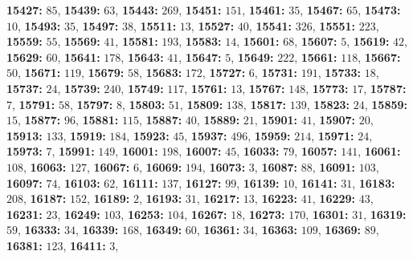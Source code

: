 \textsf{\bfseries 15427:} $85$, \textsf{\bfseries 15439:} $63$, \textsf{\bfseries 15443:} $269$, \textsf{\bfseries 15451:} $151$, \textsf{\bfseries 15461:} $35$, \textsf{\bfseries 15467:} $65$, \textsf{\bfseries 15473:} $10$, \textsf{\bfseries 15493:} $35$, \textsf{\bfseries 15497:} $38$, \textsf{\bfseries 15511:} $13$, \textsf{\bfseries 15527:} $40$, \textsf{\bfseries 15541:} $326$, \textsf{\bfseries 15551:} $223$, \textsf{\bfseries 15559:} $55$, \textsf{\bfseries 15569:} $41$, \textsf{\bfseries 15581:} $193$, \textsf{\bfseries 15583:} $14$, \textsf{\bfseries 15601:} $68$, \textsf{\bfseries 15607:} $5$, \textsf{\bfseries 15619:} $42$, \textsf{\bfseries 15629:} $60$, \textsf{\bfseries 15641:} $178$, \textsf{\bfseries 15643:} $41$, \textsf{\bfseries 15647:} $5$, \textsf{\bfseries 15649:} $222$, \textsf{\bfseries 15661:} $118$, \textsf{\bfseries 15667:} $50$, \textsf{\bfseries 15671:} $119$, \textsf{\bfseries 15679:} $58$, \textsf{\bfseries 15683:} $172$, \textsf{\bfseries 15727:} $6$, \textsf{\bfseries 15731:} $191$, \textsf{\bfseries 15733:} $18$, \textsf{\bfseries 15737:} $24$, \textsf{\bfseries 15739:} $240$, \textsf{\bfseries 15749:} $117$, \textsf{\bfseries 15761:} $13$, \textsf{\bfseries 15767:} $148$, \textsf{\bfseries 15773:} $17$, \textsf{\bfseries 15787:} $7$, \textsf{\bfseries 15791:} $58$, \textsf{\bfseries 15797:} $8$, \textsf{\bfseries 15803:} $51$, \textsf{\bfseries 15809:} $138$, \textsf{\bfseries 15817:} $139$, \textsf{\bfseries 15823:} $24$, \textsf{\bfseries 15859:} $15$, \textsf{\bfseries 15877:} $96$, \textsf{\bfseries 15881:} $115$, \textsf{\bfseries 15887:} $40$, \textsf{\bfseries 15889:} $21$, \textsf{\bfseries 15901:} $41$, \textsf{\bfseries 15907:} $20$, \textsf{\bfseries 15913:} $133$, \textsf{\bfseries 15919:} $184$, \textsf{\bfseries 15923:} $45$, \textsf{\bfseries 15937:} $496$, \textsf{\bfseries 15959:} $214$, \textsf{\bfseries 15971:} $24$, \textsf{\bfseries 15973:} $7$, \textsf{\bfseries 15991:} $149$, \textsf{\bfseries 16001:} $198$, \textsf{\bfseries 16007:} $45$, \textsf{\bfseries 16033:} $79$, \textsf{\bfseries 16057:} $141$, \textsf{\bfseries 16061:} $108$, \textsf{\bfseries 16063:} $127$, \textsf{\bfseries 16067:} $6$, \textsf{\bfseries 16069:} $194$, \textsf{\bfseries 16073:} $3$, \textsf{\bfseries 16087:} $88$, \textsf{\bfseries 16091:} $103$, \textsf{\bfseries 16097:} $74$, \textsf{\bfseries 16103:} $62$, \textsf{\bfseries 16111:} $137$, \textsf{\bfseries 16127:} $99$, \textsf{\bfseries 16139:} $10$, \textsf{\bfseries 16141:} $31$, \textsf{\bfseries 16183:} $208$, \textsf{\bfseries 16187:} $152$, \textsf{\bfseries 16189:} $2$, \textsf{\bfseries 16193:} $31$, \textsf{\bfseries 16217:} $13$, \textsf{\bfseries 16223:} $41$, \textsf{\bfseries 16229:} $43$, \textsf{\bfseries 16231:} $23$, \textsf{\bfseries 16249:} $103$, \textsf{\bfseries 16253:} $104$, \textsf{\bfseries 16267:} $18$, \textsf{\bfseries 16273:} $170$, \textsf{\bfseries 16301:} $31$, \textsf{\bfseries 16319:} $59$, \textsf{\bfseries 16333:} $34$, \textsf{\bfseries 16339:} $168$, \textsf{\bfseries 16349:} $60$, \textsf{\bfseries 16361:} $34$, \textsf{\bfseries 16363:} $109$, \textsf{\bfseries 16369:} $89$, \textsf{\bfseries 16381:} $123$, \textsf{\bfseries 16411:} $3$, 
